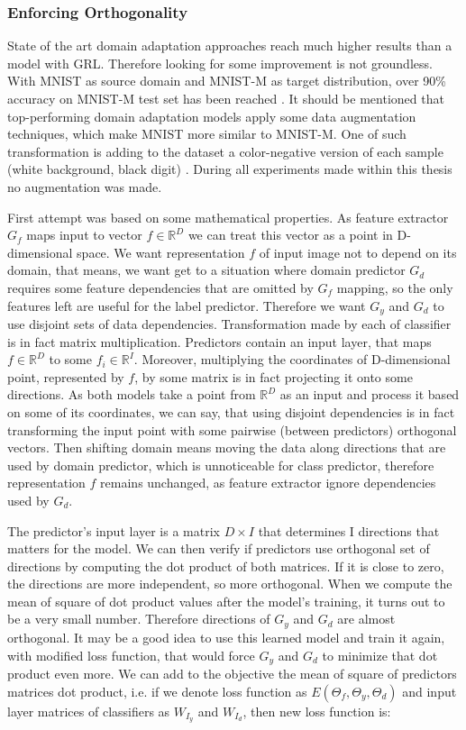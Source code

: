\documentclass{article}
\begin{document}
\subsubsection{Enforcing Orthogonality}
State of the art domain adaptation approaches reach much higher results than a model with GRL. Therefore looking for some improvement is not groundless. With MNIST as source domain and MNIST-M as target distribution, over 90\% accuracy on MNIST-M test set has been reached \cite{dida}. It should be mentioned that top-performing domain adaptation models apply some data augmentation techniques, which make MNIST more similar to MNIST-M. One of such transformation is adding to the dataset a color-negative version of each sample (white background, black digit) \cite{augm}. During all experiments made within this thesis no augmentation was made.
\par
First attempt was based on some mathematical properties. As feature extractor $G_{f}$ maps input to vector $f \in \mathbb{R}^{D}$ we can treat this vector as a point in D-dimensional space. We want representation $f$ of input image not to depend on its domain, that means, we want get to a situation where domain predictor $G_{d}$ requires some feature dependencies that are omitted by $G_{f}$ mapping, so the only features left are useful for the label predictor. Therefore we want $G_{y}$ and $G_{d}$ to use disjoint sets of data dependencies. Transformation made by each of classifier is in fact matrix multiplication. Predictors contain an input layer, that maps $f \in \mathbb{R}^{D}$ to some $f_{i} \in \mathbb{R}^{I}$. Moreover, multiplying the coordinates of D-dimensional point, represented by $f$, by some matrix is in fact projecting it onto some directions.  As both models take a point from $\mathbb{R}^{D}$ as an input and process it based on some of its coordinates, we can say, that using disjoint dependencies is in fact transforming the input point with some pairwise (between predictors) orthogonal vectors. Then shifting domain means moving the data along directions that are used by domain predictor, which is unnoticeable for class predictor, therefore representation $f$ remains unchanged, as feature extractor ignore dependencies used by $G_{d}$.
\par
The predictor's input layer is a matrix $D \times I$ that determines I directions that matters for the model. We can then verify if predictors use orthogonal set of directions by computing the dot product of both matrices. If it is close to zero, the directions are more independent, so more orthogonal. When we compute the mean of square of dot product values after the model's training, it turns out to be a very small number. Therefore directions of $G_{y}$ and $G_{d}$ are almost orthogonal. It may be a good idea to use this learned model and train it again, with modified loss function, that would force $G_{y}$ and $G_{d}$ to minimize that dot product even more. We can add to the objective the mean of square of predictors matrices dot product, i.e. if we denote loss function as $E(\Theta_{f}, \Theta_{y}, \Theta_{d})$ and input layer matrices of classifiers as $W_{I_{y}}$ and $W_{I_{d}}$, then new loss function is:
\end{document}

